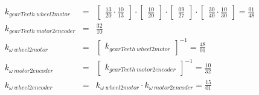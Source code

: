 \documentclass[crop=false,float=true,class=scrreprt]{standalone}
\begin{document}
\begin{align}
\label{EQN:preliminaryDecisions:selectionHardwareSoftware:hardware:components:motor:gearTeeth:finalValue1}
k_{gearTeeth\ wheel2motor}
&=&
\begin{bmatrix} \displaystyle
\frac{13}{20} \cdot\frac{10}{13}
\end{bmatrix}
\cdot %
\begin{bmatrix} \displaystyle
\frac{10}{20}
\end{bmatrix}
\cdot %
\begin{bmatrix} \displaystyle
\frac{09}{27}
\end{bmatrix}
\cdot %
\begin{bmatrix} \displaystyle
\frac{30}{40} \cdot\frac{10}{30}
\end{bmatrix}
=
\frac{01}{48}
\\[+2em]
k_{gearTeeth\ motor2encoder}
&=&
\frac{32}{10}
\\[+2em]
k_{\omega\ wheel2motor}
&=&
\begin{bmatrix} \displaystyle
k_{gearTeeth\ wheel2motor}
\end{bmatrix}^{-1}
=
\frac{48}{01}
\\[+2em]
k_{\omega \ motor2encoder}
&=&
\begin{bmatrix} \displaystyle
k_{gearTeeth\ motor2encoder}
\end{bmatrix}^{-1}
=
\frac{10}{32}
\\[+2em]
\label{EQN:preliminaryDecisions:selectionHardwareSoftware:hardware:components:motor:gearTeeth:finalValue6}
k_{\omega\ wheel2encoder}
&=&
k_{\omega\ wheel2motor}
\cdot
k_{\omega\ motor2encoder}
=
\frac{15}{01}
\end{align}




\iffalse

\subsubsubsectionA{Motor}

motor torque constant\\
motor back emf constant\\


\subsubsubsectionA{Encoder}

slots\\
binary\\
quadrature\\

\fi





\clearpage
\end{document}
